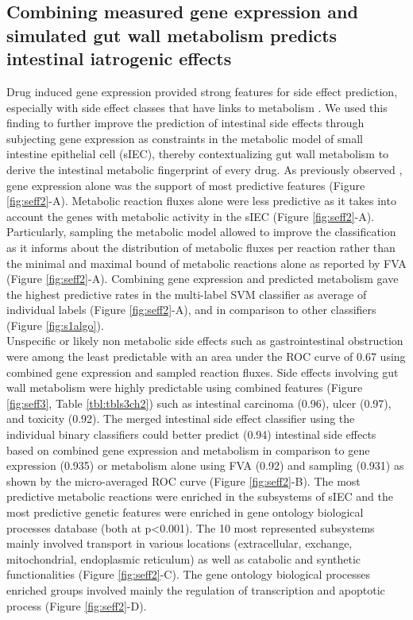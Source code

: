 \subsection{Combining measured gene expression and simulated gut wall metabolism predicts intestinal iatrogenic effects}
Drug induced gene expression provided strong features for side effect prediction, especially with side effect classes that have links to metabolism \cite{wang2016drug}. We used this finding to further improve the prediction of intestinal side effects through subjecting gene expression as constraints in the metabolic model of small intestine epithelial cell (sIEC), thereby contextualizing gut wall metabolism to derive the intestinal metabolic fingerprint of every drug. As previously observed \cite{wang2016drug}, gene expression alone was the support of most predictive features (Figure \ref{fig:seff2}-A). Metabolic reaction fluxes alone were less predictive as it takes into account the genes with metabolic activity in the sIEC (Figure \ref{fig:seff2}-A). Particularly, sampling the metabolic model allowed to improve the classification as it informs about the distribution of metabolic fluxes per reaction rather than the minimal and maximal bound of metabolic reactions alone as reported by FVA (Figure \ref{fig:seff2}-A). Combining gene expression and predicted metabolism gave the highest predictive rates in the multi-label SVM classifier as average of individual labels (Figure \ref{fig:seff2}-A), and in comparison to other classifiers (Figure \ref{fig:s1algo}).\\
Unspecific or likely non metabolic side effects such as gastrointestinal obstruction were among the least predictable with an area under the ROC curve of 0.67 using combined gene expression and sampled reaction fluxes. Side effects involving gut wall metabolism were highly predictable using combined features (Figure \ref{fig:seff3}, Table \ref{tbl:tbls3ch2}) such as intestinal carcinoma (0.96), ulcer (0.97), and toxicity (0.92). The merged intestinal side effect classifier using the individual binary classifiers could better predict (0.94) intestinal side effects based on combined gene expression and metabolism in comparison to gene expression (0.935)  or metabolism alone using FVA (0.92) and sampling (0.931) as shown by the micro-averaged ROC curve (Figure \ref{fig:seff2}-B). The most predictive metabolic reactions were enriched in the subsystems of sIEC and the most predictive genetic features were enriched in gene ontology biological processes database (both at p<0.001). The 10 most represented subsystems mainly involved transport in various locations (extracellular, exchange, mitochondrial, endoplasmic reticulum)  as well as catabolic and synthetic functionalities (Figure \ref{fig:seff2}-C). The gene ontology biological processes enriched groups involved mainly the regulation of transcription and apoptotic process (Figure \ref{fig:seff2}-D).  

